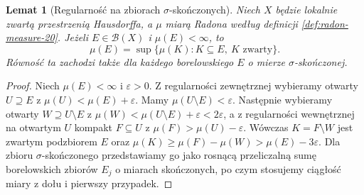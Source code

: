 \documentclass[11pt,a4paper,oneside]{book}
\numberwithin{equation}{chapter}
\theoremstyle{plain}
\newtheorem{lemat}[twierdzenie]{Lemat}
\theoremstyle{definition}
\theoremstyle{remark}
\begin{document}
\begin{lemat}[Regularność na zbiorach $\sigma$-skończonych]
\label{lem:radon-sigmafinite-inner-20}
Niech $X$ będzie lokalnie zwartą przestrzenią Hausdorffa,
a $\mu$ miarą Radona według definicji
\ref{def:radon-measure-20}. Jeżeli $E\in\mathcal B(X)$
i $\mu(E)<\infty$, to
\[
 \mu(E)=\sup\{\mu(K):K\subseteq E,\ K\text{ zwarty}\}.
\]
Równość ta zachodzi także dla każdego borelowskiego
$E$ o mierze $\sigma$-skończonej.
\end{lemat}
\begin{proof}
Niech $\mu(E)<\infty$ i $\varepsilon>0$.
Z regularności zewnętrznej wybieramy otwarty
$U\supseteq E$ z $\mu(U)<\mu(E)+\varepsilon$.
Mamy $\mu(U\setminus E)<\varepsilon$.
Następnie wybieramy otwarty $W\supseteq U\setminus E$
z $\mu(W)<\mu(U\setminus E)+\varepsilon<2\varepsilon$,
a z regularności wewnętrznej na otwartym $U$ kompakt
$F\subseteq U$ z $\mu(F)>\mu(U)-\varepsilon$.
Wówczas $K=F\setminus W$ jest zwartym podzbiorem $E$ oraz
$\mu(K)\ge\mu(F)-\mu(W)>\mu(E)-3\varepsilon$.
Dla zbioru $\sigma$-skończonego przedstawiamy go jako
rosnącą przeliczalną sumę borelowskich zbiorów
$E_j$ o miarach skończonych, po czym stosujemy
ciągłość miary z dołu i pierwszy przypadek.
\end{proof}
\end{document}
